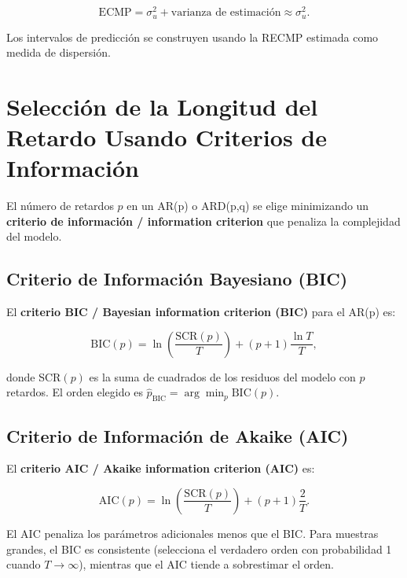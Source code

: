 \documentclass[12pt]{article}
\begin{document}
\begin{equation}
  \text{ECMP} = \sigma_u^2 + \text{varianza de estimaci\'on} \approx \sigma_u^2.
  \label{eq:ecmp}
\end{equation}

Los intervalos de predicci\'on se construyen usando la RECMP estimada como medida de dispersi\'on.

\section{Selecci\'on de la Longitud del Retardo Usando Criterios de Informaci\'on}

El n\'umero de retardos $p$ en un AR(p) o ARD(p,q) se elige minimizando un \textbf{criterio de informaci\'on / information criterion} que penaliza la complejidad del modelo.

\subsection{Criterio de Informaci\'on Bayesiano (BIC)}

El \textbf{criterio BIC / Bayesian information criterion (BIC)} para el AR(p) es:

\begin{equation}
  \text{BIC}(p) = \ln\!\left(\frac{\text{SCR}(p)}{T}\right) + (p+1)\frac{\ln T}{T},
  \label{eq:bic}
\end{equation}

donde SCR$(p)$ es la suma de cuadrados de los residuos del modelo con $p$ retardos. El orden elegido es $\hat{p}_{\text{BIC}} = \arg\min_p \text{BIC}(p)$.

\subsection{Criterio de Informaci\'on de Akaike (AIC)}

El \textbf{criterio AIC / Akaike information criterion (AIC)} es:

\begin{equation}
  \text{AIC}(p) = \ln\!\left(\frac{\text{SCR}(p)}{T}\right) + (p+1)\frac{2}{T}.
  \label{eq:aic}
\end{equation}

El AIC penaliza los par\'ametros adicionales menos que el BIC. Para muestras grandes, el BIC es consistente (selecciona el verdadero orden con probabilidad 1 cuando $T \to \infty$), mientras que el AIC tiende a sobrestimar el orden.
\end{document}
